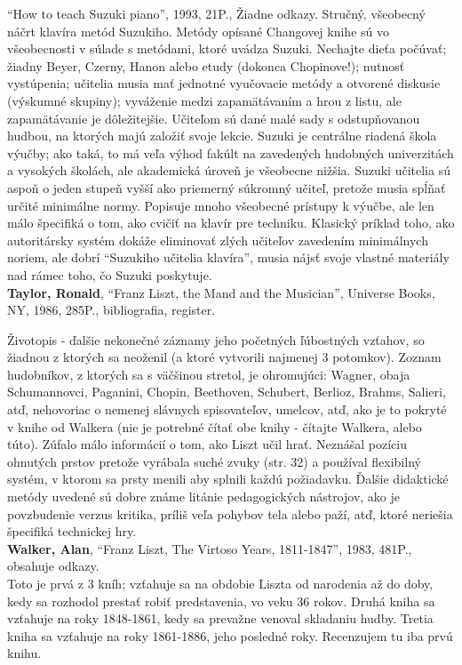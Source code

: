 \documentclass[11pt,a4paper]{book}
\begin{document}
“How to teach Suzuki piano”, 1993, 21P., Žiadne odkazy. Stručný, všeobecný náčrt klavíra metód Suzukiho. Metódy opísané Changovej knihe sú vo všeobecnosti v súlade s metódami, ktoré uvádza Suzuki. Nechajte dieťa počúvať; žiadny Beyer, Czerny, Hanon alebo etudy (dokonca Chopinove!); nutnosť vystúpenia; učitelia musia mať jednotné vyučovacie metódy a otvorené diskusie (výskumné skupiny); vyváženie medzi zapamätávaním a hrou z listu, ale zapamätávanie je dôležitejšie. Učiteľom sú dané malé sady s odstupňovanou hudbou, na ktorých majú založiť svoje lekcie. Suzuki je centrálne riadená škola výučby; ako taká, to má veľa výhod fakúlt na zavedených hudobných univerzitách a vysokých školách, ale akademická úroveň je všeobecne nižšia. Suzuki učitelia sú aspoň o jeden stupeň vyšší ako priemerný súkromný učiteľ, pretože musia spĺňať určité minimálne normy. Popisuje mnoho všeobecné prístupy k výučbe, ale len málo špecifiká o tom, ako cvičiť na klavír pre techniku. Klasický príklad toho, ako autoritársky systém dokáže eliminovať zlých učiteľov zavedením minimálnych noriem, ale dobrí “Suzukiho učitelia klavíra”, musia nájsť svoje vlastné materiály nad rámec toho, čo Suzuki poskytuje.
\medskip\\
\textbf{Taylor, Ronald}, “Franz Liszt, the Mand and the Musician”, Universe Books, NY, 1986, 285P., bibliografia, register. 

Životopis - ďalšie nekonečné záznamy jeho početných ľúbostných vzťahov, so žiadnou z ktorých sa neoženil (a ktoré vytvorili najmenej 3 potomkov). Zoznam hudobníkov, z ktorých sa s väčšinou stretol, je ohromujúci: Wagner, obaja Schumannovci, Paganini, Chopin, Beethoven, Schubert, Berlioz, Brahms, Salieri, atď, nehovoriac o nemenej slávnych spisovateľov, umelcov, atď, ako je to pokryté v knihe od  Walkera (nie je potrebné čítať obe knihy - čítajte Walkera, alebo túto). Zúfalo málo informácií o tom, ako Liszt učil hrať. Neznášal pozíciu ohnutých prstov pretože vyrábala suché zvuky (str. 32) a používal flexibilný systém, v ktorom sa prsty menili aby splnili každú požiadavku. Ďalšie didaktické metódy uvedené sú dobre známe litánie pedagogických nástrojov, ako je povzbudenie verzus kritika, príliš veľa pohybov tela alebo paží, atď, ktoré neriešia špecifiká technickej hry. 
\medskip\\
\textbf{Walker, Alan}, “Franz Liszt, The Virtoso Years, 1811-1847”, 1983, 481P., obsahuje odkazy.\\
Toto je prvá z 3 kníh; vzťahuje sa na obdobie Liszta od narodenia až do doby, kedy sa rozhodol prestať  robiť predstavenia, vo veku 36 rokov. Druhá kniha sa vzťahuje na roky 1848-1861, kedy sa prevažne venoval skladaniu hudby. Tretia kniha sa vzťahuje na roky 1861-1886, jeho posledné roky. Recenzujem tu iba prvú knihu. 
\end{document}

